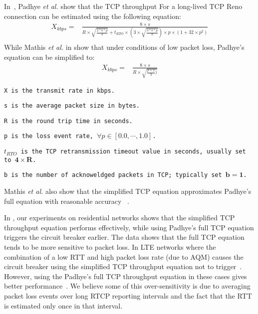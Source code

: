 In~\cite{padhye1998modeling}, Padhye \emph{et al.} show that the TCP
throughput For a long-lived TCP Reno connection can be estimated using the
following equation:
\begin{align*}
X_{kbps} = &\frac{8 \times s}{R \times \sqrt{\frac{2*b*p}{3}}+t_{RTO} \times (3 \times \sqrt{\frac{3*b*p}{8}})\times p \times (1+32 \times p^2)}\\
\end{align*}
While Mathis \emph{et al.} in \cite{mathis1997macroscopic} show that under
conditions of low packet loss, Padhye's equation can be simplified to:
\begin{align*}
    X_{kbps} = & \frac{8 \times s}{R \times \sqrt{\frac{p \times 2}{3})}}
\end{align*}
\begin{itemize}
\setlength{\itemsep}{0pt}
{\footnotesize
\item[] \texttt{X is the transmit rate in kbps.}
\item[] \texttt{s is the average packet size in bytes.} 
\item[] \texttt{R is the round trip time in seconds. }
\item[] \texttt{p is the loss event rate, $\forall p \in [0.0, \cdots ,1.0]$.}
\item[] \texttt{$t_{RTO}$ is the TCP retransmission timeout value in seconds, usually set to $\mathbf{4 \times R}$.}
\item[] \texttt{b is the number of acknoweldged packets in TCP; typically set $\mathbf{b=1}$.}
}
\end{itemize}
Mathis \emph{et al.} also show that the simplified TCP equation approximates
Padhye's full equation with reasonable accuracy~\cite{mathis1997macroscopic} .


In , our experiments on residential networks shows that the
simplified TCP throughput equation performs effectively, while using Padhye's
full TCP equation triggers the circuit breaker earlier. The data shows that
the full TCP equation tends to be more sensitive to packet loss. In LTE
networks where the combination of a low RTT and high packet loss rate (due to
AQM) causes the circuit breaker using the simplified TCP throughput equation
not to trigger~\cite{Sarker:CB.lte}. However, using the Padhye's full TCP
throughput equation in these cases gives better
performance~\cite{Sarker:CB.lte}. We believe some of this over-sensitivity is
due to averaging packet loss events over long RTCP reporting intervals and the
fact that the RTT is estimated only once in that interval.

